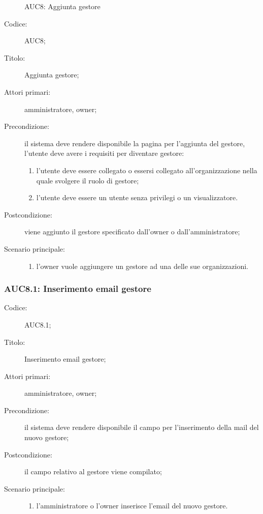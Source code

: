 \documentclass[../../../analisi-dei-requisiti.tex]{subfiles}
\begin{document}
\begin{figure}[H]
  \centering
  \caption{AUC8: Aggiunta gestore}%
  \label{fig:AUC8}
\end{figure}

\begin{description}
  \item[Codice:] AUC8;
  \item[Titolo:] Aggiunta gestore;
  \item[Attori primari:] amministratore, owner;
  \item[Precondizione:] il sistema deve rendere disponibile la pagina per l'aggiunta del gestore, l'utente deve avere i requisiti per diventare gestore:
  \begin{enumerate}
    \item l'utente deve essere collegato o essersi collegato all'organizzazione nella quale svolgere il ruolo di gestore;
    \item l'utente deve essere un utente senza privilegi o un visualizzatore.
  \end{enumerate}
  \item[Postcondizione:] viene aggiunto il gestore specificato dall'owner o dall'amministratore;
  \item[Scenario principale:]
  \begin{enumerate}
    \item l'owner vuole aggiungere un gestore ad una delle sue organizzazioni.
  \end{enumerate}
\end{description}

\subsubsection{AUC8.1: Inserimento email gestore}%
\label{subs:AUC8.1}
\begin{description}
  \item[Codice:] AUC8.1;
  \item[Titolo:] Inserimento email gestore;
  \item[Attori primari:] amministratore, owner;
  \item[Precondizione:] il sistema deve rendere disponibile il campo per l'inserimento della mail del nuovo gestore;
  \item[Postcondizione:] il campo relativo al gestore viene compilato;
  \item[Scenario principale:]
  \begin{enumerate}
    \item l'amministratore o l'owner inserisce l'email del nuovo gestore.
  \end{enumerate}
\end{description}
\end{document}
